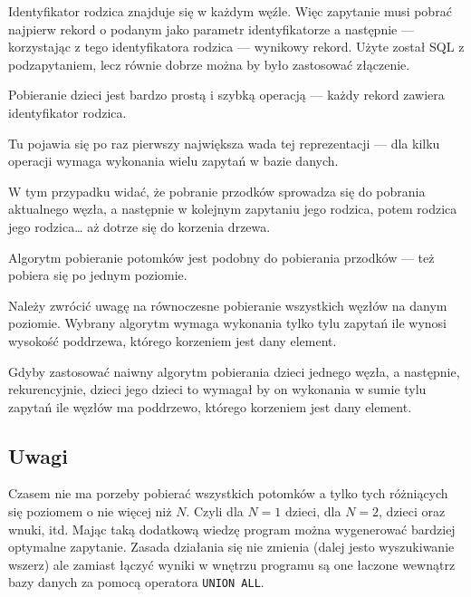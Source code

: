 
Identyfikator rodzica znajduje się w każdym węźle.
Więc zapytanie musi pobrać najpierw rekord o podanym jako parametr identyfikatorze a następnie
--- korzystając z tego identyfikatora rodzica --- wynikowy rekord.
Użyte został SQL z podzapytaniem, lecz równie dobrze można by było zastosować złączenie. 




Pobieranie dzieci jest bardzo prostą i szybką operacją
--- każdy rekord zawiera identyfikator rodzica.



Tu pojawia się po raz pierwszy największa wada tej reprezentacji --- 
dla kilku operacji wymaga wykonania wielu zapytań w bazie danych.

W tym przypadku widać, że pobranie przodków sprowadza się do pobrania aktualnego węzła,
a następnie w kolejnym zapytaniu jego rodzica,
potem rodzica jego rodzica\ldots
aż dotrze się do korzenia drzewa.





Algorytm pobieranie potomków jest podobny do pobierania przodków --- też pobiera się po jednym poziomie.


Należy zwrócić uwagę na równoczesne pobieranie wszystkich węzłów na danym poziomie.
Wybrany algorytm wymaga wykonania tylko tylu zapytań ile wynosi wysokość poddrzewa,
którego korzeniem jest dany element.


Gdyby zastosować naiwny algorytm pobierania dzieci jednego węzła,
a następnie, rekurencyjnie, dzieci jego dzieci
to wymagał by on wykonania w sumie tylu zapytań ile węzłów ma poddrzewo,
którego korzeniem jest dany element.


\subsection{Uwagi}

Czasem nie ma porzeby pobierać wszystkich potomków a tylko tych różniących się poziomem o nie więcej niż $N$.
Czyli dla $N = 1$ dzieci, dla $N = 2$, dzieci oraz wnuki, itd.
Mając taką dodatkową wiedzę program można wygenerować bardziej optymalne zapytanie.
Zasada działania się nie zmienia (dalej jesto wyszukiwanie wszerz)
ale zamiast łączyć wyniki w wnętrzu programu są one łaczone wewnątrz bazy danych za pomocą operatora \texttt{UNION ALL}.

